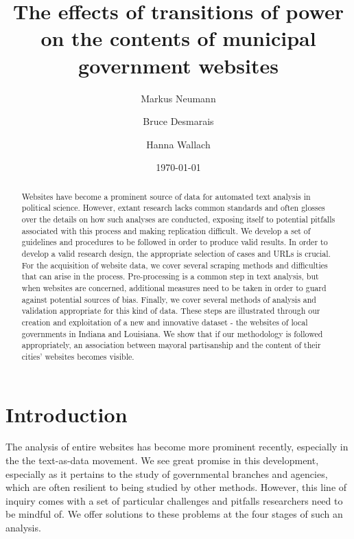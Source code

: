 \documentclass[11pt]{article}
\title{\vspace{-2cm} The effects of transitions of power on the contents of municipal government websites }
\author{ Markus Neumann \and Bruce Desmarais \and Hanna Wallach} \date{\today}
\begin{document}
\maketitle




\begin{abstract}

Websites have become a prominent source of data for automated text analysis in political science. However, extant research lacks common standards and often glosses over the details on how such analyses are conducted, exposing itself to potential pitfalls associated with this process and making replication difficult. We develop a set of guidelines and procedures to be followed in order to produce valid results. In order to develop a valid research design, the appropriate selection of cases and URLs is crucial. For the acquisition of website data, we cover several scraping methods and difficulties that can arise in the process. Pre-processing is a common step in text analysis, but when websites are concerned, additional measures need to be taken in order to guard against potential sources of bias. Finally, we cover several methods of analysis and validation appropriate for this kind of data. These steps are illustrated through our creation and exploitation of a new and innovative dataset - the websites of local governments in Indiana and Louisiana. We show that if our methodology is followed appropriately, an association between mayoral partisanship and the content of their cities' websites becomes visible.

\end{abstract}
\thispagestyle{empty}
\section{Introduction}

The analysis of entire websites has become more prominent recently, especially in the the text-as-data movement. We see great promise in this development, especially as it pertains to the study of governmental branches and agencies, which are often resilient to being studied by other methods. However, this line of inquiry comes with a set of particular challenges and pitfalls researchers need to be mindful of. We offer solutions to these problems at the four stages of such an analysis.
\end{document}
